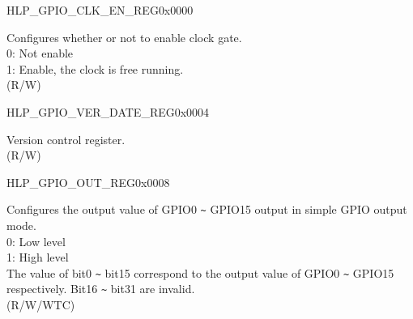 \begin{register}{H}{LP\_GPIO\_CLK\_EN\_REG}{0x0000}\label{regdesc:LPGPIOCLKENREG}
%
%
\regnewline%
\begin{regdesc}\begin{reglist}
\label{fielddesc:LPGPIOCLKEN}\item [LP\_GPIO\_CLK\_EN] Configures whether or not to enable clock gate.\\
0: Not enable\\
1: Enable, the clock is free running. \\
(R/W)
\end{reglist}\end{regdesc}
\end{register}


\begin{register}{H}{LP\_GPIO\_VER\_DATE\_REG}{0x0004}\label{regdesc:LPGPIOVERDATEREG}
%
%
\regnewline%
\begin{regdesc}\begin{reglist}
\label{fielddesc:LPGPIOVERDATE}\item [LP\_GPIO\_VER\_DATE] Version control register. \\
(R/W)
\end{reglist}\end{regdesc}
\end{register}


\begin{register}{H}{LP\_GPIO\_OUT\_REG}{0x0008}\label{regdesc:LPGPIOOUTREG}
%
%
\regnewline%
\begin{regdesc}\begin{reglist}
\label{fielddesc:LPGPIOOUTDATA}\item [LP\_GPIO\_OUT\_DATA]  Configures the output value of GPIO0 \verb+~+ GPIO15 output in simple GPIO output mode.\\
0: Low level\\
1: High level\\
The value of bit0 \verb+~+ bit15 correspond to the output value of GPIO0 \verb+~+ GPIO15 respectively. Bit16 \verb+~+ bit31 are invalid.\\
(R/W/WTC)
\end{reglist}\end{regdesc}
\end{register}


